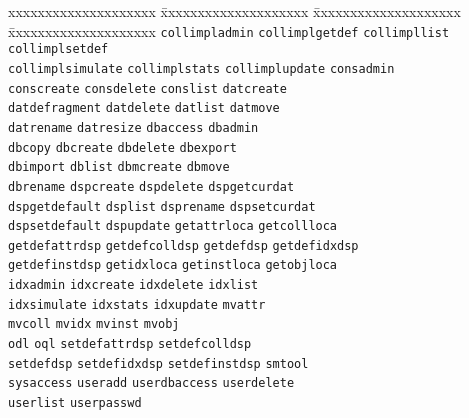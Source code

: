 \begin{tabbing}
xxxxxxxxxxxxxxxxxxxx \= xxxxxxxxxxxxxxxxxxxx \= xxxxxxxxxxxxxxxxxxxx \= xxxxxxxxxxxxxxxxxxxx \kill
\texttt{collimpladmin} \> \texttt{collimplgetdef} \> \texttt{collimpllist} \> \texttt{collimplsetdef} \\
\texttt{collimplsimulate} \> \texttt{collimplstats} \> \texttt{collimplupdate} \> \texttt{consadmin} \\
\texttt{conscreate} \> \texttt{consdelete} \> \texttt{conslist} \> \texttt{datcreate} \\
\texttt{datdefragment} \> \texttt{datdelete} \> \texttt{datlist} \> \texttt{datmove} \\
\texttt{datrename} \> \texttt{datresize} \> \texttt{dbaccess} \> \texttt{dbadmin} \\
\texttt{dbcopy} \> \texttt{dbcreate} \> \texttt{dbdelete} \> \texttt{dbexport} \\
\texttt{dbimport} \> \texttt{dblist} \> \texttt{dbmcreate} \> \texttt{dbmove} \\
\texttt{dbrename} \> \texttt{dspcreate} \> \texttt{dspdelete} \> \texttt{dspgetcurdat} \\
\texttt{dspgetdefault} \> \texttt{dsplist} \> \texttt{dsprename} \> \texttt{dspsetcurdat} \\
\texttt{dspsetdefault} \> \texttt{dspupdate} \> \texttt{getattrloca} \> \texttt{getcollloca} \\
\texttt{getdefattrdsp} \> \texttt{getdefcolldsp} \> \texttt{getdefdsp} \> \texttt{getdefidxdsp} \\
\texttt{getdefinstdsp} \> \texttt{getidxloca} \> \texttt{getinstloca} \> \texttt{getobjloca} \\
\texttt{idxadmin} \> \texttt{idxcreate} \> \texttt{idxdelete} \> \texttt{idxlist} \\
\texttt{idxsimulate} \> \texttt{idxstats} \> \texttt{idxupdate} \> \texttt{mvattr} \\
\texttt{mvcoll} \> \texttt{mvidx} \> \texttt{mvinst} \> \texttt{mvobj} \\
\texttt{odl} \> \texttt{oql} \> \texttt{setdefattrdsp} \> \texttt{setdefcolldsp} \\
\texttt{setdefdsp} \> \texttt{setdefidxdsp} \> \texttt{setdefinstdsp} \> \texttt{smtool} \\
\texttt{sysaccess} \> \texttt{useradd} \> \texttt{userdbaccess} \> \texttt{userdelete} \\
\texttt{userlist} \> \texttt{userpasswd} \\

\end{tabbing}
